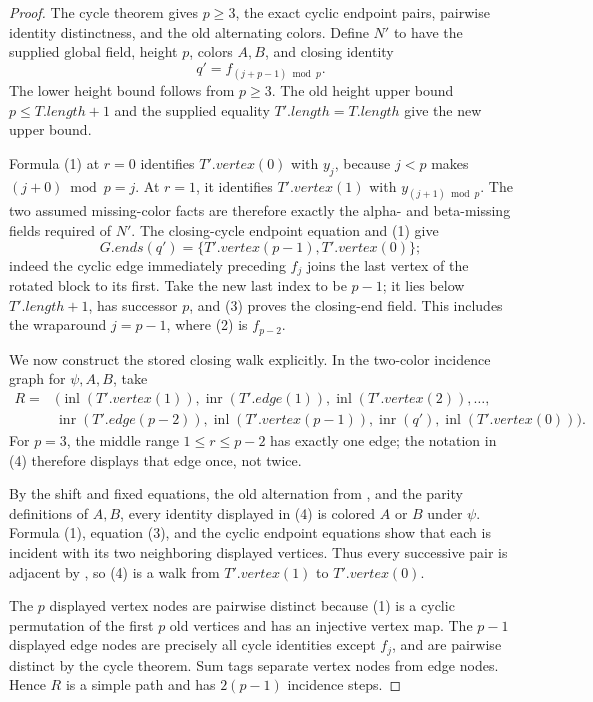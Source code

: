 \begin{proof}
The cycle theorem  gives $p\geq3$,
the exact cyclic endpoint pairs, pairwise identity distinctness, and the
old alternating colors.  Define $N'$ to have the supplied global field,
height $p$, colors $A,B$, and closing identity
\[
 q'=f_{(j+p-1)\bmod p}.                                      \tag{2}
\]
The lower height bound follows from $p\geq3$.  The old height upper bound
$p\leq T.length+1$ and the supplied equality
$T'.length=T.length$ give the new upper bound.

Formula (1) at $r=0$ identifies $T'.vertex(0)$ with $y_j$, because
$j<p$ makes $(j+0)\bmod p=j$.  At $r=1$, it identifies
$T'.vertex(1)$ with $y_{(j+1)\bmod p}$.  The two assumed missing-color
facts are therefore exactly the alpha- and beta-missing fields required
of $N'$.  The closing-cycle endpoint equation and (1) give
\[
 G.ends(q')=\{T'.vertex(p-1),T'.vertex(0)\};                   \tag{3}
\]
indeed the cyclic edge immediately preceding $f_j$ joins the last vertex
of the rotated block to its first.  Take the new last index to be $p-1$;
it lies below $T'.length+1$, has successor $p$, and (3) proves the
closing-end field.  This includes the wraparound $j=p-1$, where (2) is
$f_{p-2}$.

We now construct the stored closing walk explicitly.  In the two-color
incidence graph for $\psi,A,B$, take
\[
 \begin{split}
 R={}&(\operatorname{inl}(T'.vertex(1)),
       \operatorname{inr}(T'.edge(1)),
       \operatorname{inl}(T'.vertex(2)),\ldots,\\
    &\operatorname{inr}(T'.edge(p-2)),
       \operatorname{inl}(T'.vertex(p-1)),
       \operatorname{inr}(q'),
       \operatorname{inl}(T'.vertex(0))).                     \tag{4}
 \end{split}
\]
For $p=3$, the middle range $1\leq r\leq p-2$ has exactly one edge; the
notation in (4) therefore displays that edge once, not twice.

By the shift and fixed equations, the old alternation from
, and the parity definitions of $A,B$,
every identity displayed in (4) is colored $A$ or $B$ under $\psi$.
Formula (1), equation (3), and the cyclic endpoint equations show that
each is incident with its two neighboring displayed vertices.  Thus every
successive pair is adjacent by , so (4)
is a walk from $T'.vertex(1)$ to $T'.vertex(0)$.

The $p$ displayed vertex nodes are pairwise distinct because (1) is a
cyclic permutation of the first $p$ old vertices and
 has an injective vertex map.  The $p-1$ displayed
edge nodes are precisely all cycle identities except $f_j$, and are
pairwise distinct by the cycle theorem.  Sum tags separate vertex nodes
from edge nodes.  Hence $R$ is a simple path and has $2(p-1)$ incidence
steps.


\end{proof}
